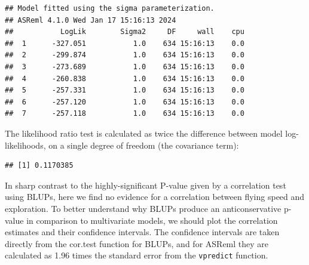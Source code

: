 \documentclass[
  12pt,
]{book}
\newenvironment{Shaded}{\begin{snugshade}}{\end{snugshade}}
\newcommand{\DataTypeTok}[1]{\textcolor[rgb]{0.13,0.29,0.53}{#1}}
\newcommand{\DecValTok}[1]{\textcolor[rgb]{0.00,0.00,0.81}{#1}}
\newcommand{\KeywordTok}[1]{\textcolor[rgb]{0.13,0.29,0.53}{\textbf{#1}}}
\newcommand{\NormalTok}[1]{#1}
\newcommand{\OperatorTok}[1]{\textcolor[rgb]{0.81,0.36,0.00}{\textbf{#1}}}
\newcommand{\OtherTok}[1]{\textcolor[rgb]{0.56,0.35,0.01}{#1}}
\newcommand{\StringTok}[1]{\textcolor[rgb]{0.31,0.60,0.02}{#1}}
\begin{document}
\begin{verbatim}
## Model fitted using the sigma parameterization.
## ASReml 4.1.0 Wed Jan 17 15:16:13 2024
##           LogLik        Sigma2     DF     wall    cpu
##  1      -327.051           1.0    634 15:16:13    0.0
##  2      -299.874           1.0    634 15:16:13    0.0
##  3      -273.689           1.0    634 15:16:13    0.0
##  4      -260.838           1.0    634 15:16:13    0.0
##  5      -257.331           1.0    634 15:16:13    0.0
##  6      -257.120           1.0    634 15:16:13    0.0
##  7      -257.118           1.0    634 15:16:13    0.0
\end{verbatim}

The likelihood ratio test is calculated as twice the difference between model log-likelihoods, on a single degree of freedom (the covariance term):

\begin{Shaded}
\end{Shaded}

\begin{verbatim}
## [1] 0.1170385
\end{verbatim}

In sharp contrast to the highly-significant P-value given by a correlation test using BLUPs, here we find no evidence for a correlation between flying speed and exploration.
To better understand why BLUPs produce an anticonservative p-value in comparison to multivariate models, we should plot the correlation estimates and their confidence intervals. The confidence intervals are taken directly from the cor.test function for BLUPs, and for ASReml they are calculated as 1.96 times the standard error from the \texttt{vpredict} function.
\end{document}
